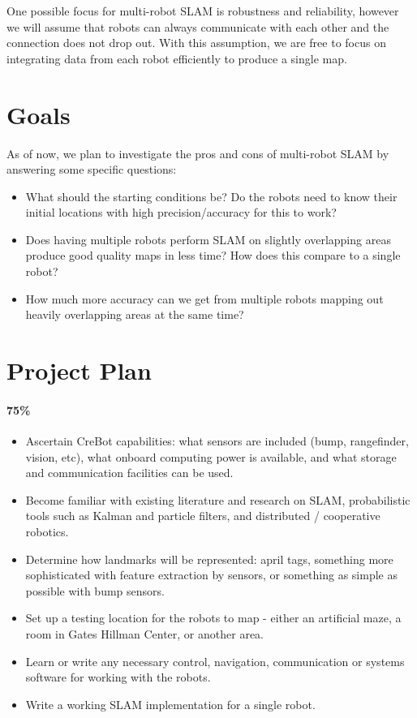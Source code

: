\documentclass[11pt]{article}
\begin{document}
One possible focus for multi-robot SLAM is robustness and reliability, however we will assume that robots can always communicate with each other and the connection does not drop out. With this assumption, we are free to focus on integrating data from each robot efficiently to produce a single map.

\section{Goals}

As of now, we plan to investigate the pros and cons of multi-robot SLAM by answering some specific questions:

\begin{itemize}
    \item What should the starting conditions be? Do the robots need to know their initial locations with high precision/accuracy for this to work?

    \item Does having multiple robots perform SLAM on slightly overlapping areas produce good quality maps in less time? How does this compare to a single robot?

    \item How much more accuracy can we get from multiple robots mapping out heavily overlapping areas at the same time?

\end{itemize}

\section*{Project Plan}

\paragraph{75\%}
\begin{itemize}
    \item Ascertain CreBot capabilities: what sensors are included (bump, rangefinder, vision, etc), what onboard computing power is available, and what storage and communication facilities can be used.
    \item Become familiar with existing literature and research on SLAM, probabilistic tools such as Kalman and particle filters, and distributed / cooperative robotics.
    \item Determine how landmarks will be represented: april tags, something more sophisticated with feature extraction by sensors, or something as simple as possible with bump sensors.
    \item Set up a testing location for the robots to map - either an artificial maze, a room in Gates Hillman Center, or another area.
    \item Learn or write any necessary control, navigation, communication or systems software for working with the robots.
    \item Write a working SLAM implementation for a single robot.
\end{itemize}
\end{document}
